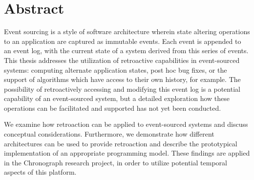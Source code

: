 \thispagestyle{page_number_bottom_center}
\section*{Abstract}

Event sourcing is a style of software architecture wherein state altering 
operations to an application are captured as immutable events. Each event 
is appended to an event log, with the current state of a system derived 
from this series of events. This thesis addresses the utilization of 
retroactive capabilities in event-sourced systems: computing alternate 
application states, post hoc bug fixes, or the support of algorithms which 
have access to their own history, for example.
The possibility of retroactively accessing and modifying this event log 
is a potential capability of an event-sourced system, but a detailed 
exploration how these operations can be facilitated and supported has not 
yet been conducted.

We examine how retroaction can be applied to event-sourced systems and 
discuss conceptual considerations. Furthermore, we demonstrate how different 
architectures can be used to provide retroaction and describe the prototypical 
implementation of an appropriate programming model.
These findings are applied in the Chronograph research project, in order to
utilize potential temporal aspects of this platform.
